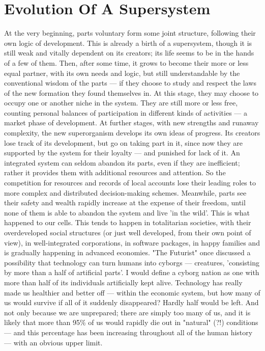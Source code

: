 \section{Evolution Of A Supersystem}

     At the very beginning, parts voluntary form some joint structure,
following  their own logic of development.  This is already a birth of
a supersystem, though it is still weak and vitally  dependent  on  its
creators;  its  life seems to be in the hands of a few of them.  Then,
after some time, it grows to become their more or less equal  partner,
with  its  own  needs  and  logic,  but  still  understandable  by the
conventional wisdom of the parts --- if they choose to study and respect
the  laws  of  the  new  formation  they found themselves in.  At this
stage, they may choose to occupy one or another niche in  the  system.
They  are  still  more  or  less  free,  counting personal balances of
participation in different kinds of activities ---  a  market  phase  of
development.   At  further  stages,  with  new  strengths  and runaway
complexity, the new superorganism develops its own ideas of  progress.
Its  creators  lose track of its development, but go on taking part in
it, since now they are supported by the system for their loyalty --- and
punished  for lack of it.  An integrated system can seldom abandon its
parts, even if they are inefficient;  rather  it  provides  them  with
additional  resources and attention.  So the competition for resources
and records of local accounts lose their leading roles to more complex
and  distributed  decision-making schemes.  Meanwhile, parts see their
safety and wealth rapidly increase at the expense  of  their  freedom,
until  none  of  them  is  able to abandon the system and live 'in the
wild'.  This is what happened to our cells.  This tends to  happen  in
totalitarian societies, with their overdeveloped social structures (or
just well developed, from their own point of view), in well-integrated
corporations, in software packages, in happy families and is gradually
happening in advanced economies.   "The  Futurist"  once  discussed  a
possibility  that technology can turn humans into cyborgs --- creatures,
'consisting by more than a half of artificial parts'.  I would  define
a  cyborg  nation  as  one  with  more  than  half  of its individuals
artificially kept alive.  Technology has really made us healthier  and
better  off  ---  within  the  economic system, but how many of us would
survive if all of it suddenly disappeared?  Hardly half would be left.
And  not  only because we are unprepared; there are simply too many of
us, and it is likely that more than 95\% of us would rapidly die out in
"natural"  (?!)  conditions  --- and this percentage has been increasing
throughout all of the human history --- with an obvious upper limit.


